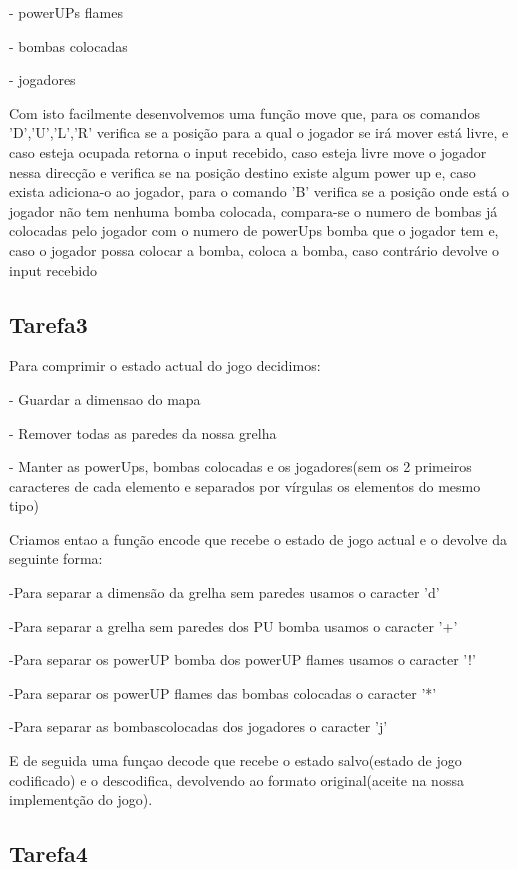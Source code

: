 \documentclass[a4paper]{article}
\begin{document}
- powerUPs flames

- bombas colocadas

- jogadores



Com isto facilmente desenvolvemos uma função move que,
para os comandos 'D','U','L','R' verifica se a posição para a qual o jogador se irá mover está livre,
e caso esteja ocupada retorna o input recebido, caso esteja livre move o jogador nessa direcção e
verifica se na posição destino existe algum power up e, caso exista adiciona-o ao jogador,
para o comando 'B' verifica se a posição onde está o jogador não tem nenhuma bomba colocada, 
compara-se o numero de bombas já colocadas pelo jogador com o numero de powerUps bomba que o jogador tem e, 
caso o jogador possa colocar a bomba, coloca a bomba, caso contrário devolve o input recebido


\subsection{Tarefa3}

Para comprimir o estado actual do jogo decidimos:

- Guardar a dimensao do mapa

- Remover todas as paredes da nossa grelha

- Manter as powerUps, bombas colocadas e os jogadores(sem os 2 primeiros caracteres de cada elemento e separados por vírgulas os elementos do mesmo tipo)

Criamos entao a função encode que recebe o estado de jogo actual e o devolve da seguinte forma:

-Para separar a dimensão da grelha sem paredes usamos o caracter 'd'

-Para separar a grelha sem paredes dos PU bomba usamos o caracter '+'

-Para separar os powerUP bomba dos powerUP flames usamos o caracter '!'

-Para separar os powerUP flames das bombas colocadas o caracter '*'

-Para separar as bombascolocadas dos jogadores o caracter 'j'

E de seguida uma funçao decode que recebe o estado salvo(estado de jogo codificado) e o descodifica, devolvendo ao formato original(aceite na nossa implementção do jogo).


\subsection{Tarefa4}
 
\end{document}
